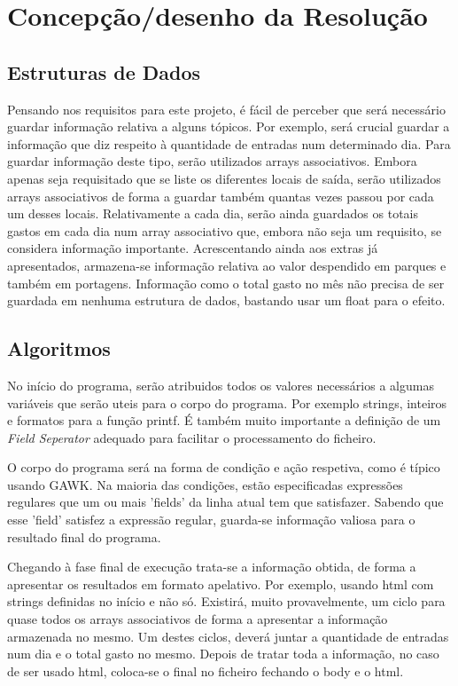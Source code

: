 \documentclass{report}
\def\fs{\emph{Field Seperator}\xspace}
\begin{document}
\chapter{Concepção/desenho da Resolução} \label{cd}
\section{Estruturas de Dados}
Pensando nos requisitos para este projeto, é fácil de perceber que será necessário 
guardar informação relativa a alguns tópicos. Por exemplo, será crucial guardar a informação que diz respeito 
à quantidade de entradas num determinado dia. Para guardar informação deste tipo, serão utilizados arrays associativos. 
Embora apenas seja requisitado que se liste os diferentes locais de saída, serão utilizados arrays associativos de 
forma a guardar também quantas vezes passou por cada um desses locais. Relativamente a cada dia, serão ainda guardados os 
totais gastos em cada dia num array associativo que, embora não seja um requisito, se considera informação importante. 
Acrescentando ainda aos extras já apresentados, armazena-se informação relativa ao valor despendido em parques e também em portagens.
Informação como o total gasto no mês não precisa de ser guardada em nenhuma estrutura de dados, bastando usar um float para o efeito.
\section{Algoritmos}
No início do programa, serão atribuidos todos os valores necessários a algumas variáveis que serão uteis para o corpo do programa.
Por exemplo strings, inteiros e formatos para a função printf.
É também muito importante a definição de um \fs adequado para facilitar o processamento do ficheiro.\par
O corpo do programa será na forma de condição e ação respetiva, como é típico usando GAWK. 
Na maioria das condições, estão especificadas expressões regulares que um ou mais 'fields' da linha atual tem que satisfazer. 
Sabendo que esse 'field' satisfez a expressão regular, guarda-se informação valiosa para o resultado final do programa.\par
Chegando à fase final de execução trata-se a informação obtida, de forma a apresentar os resultados em formato apelativo. Por exemplo, usando html com strings definidas no início e não só. Existirá, muito provavelmente, 
um ciclo para quase todos os arrays associativos de forma a apresentar a informação 
armazenada no mesmo. Um destes ciclos, deverá juntar a quantidade de entradas num dia e o total gasto no mesmo.
Depois de tratar toda a informação, no caso de ser usado html, coloca-se o final no ficheiro fechando o body e o html. 
\end{document}
